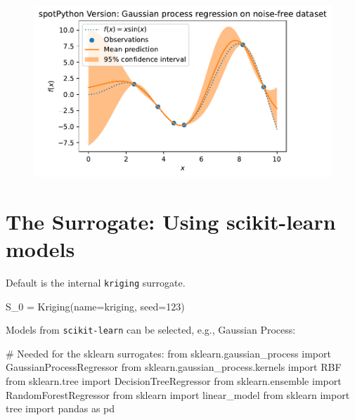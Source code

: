 \documentclass[
  letterpaper,
  DIV=11,
  numbers=noendperiod]{scrreprt}
\newenvironment{Shaded}{\begin{snugshade}}{\end{snugshade}}
\newcommand{\CommentTok}[1]{\textcolor[rgb]{0.37,0.37,0.37}{#1}}
\newcommand{\DecValTok}[1]{\textcolor[rgb]{0.68,0.00,0.00}{#1}}
\newcommand{\ImportTok}[1]{\textcolor[rgb]{0.00,0.46,0.62}{#1}}
\newcommand{\NormalTok}[1]{\textcolor[rgb]{0.00,0.23,0.31}{#1}}
\newcommand{\OperatorTok}[1]{\textcolor[rgb]{0.37,0.37,0.37}{#1}}
\newcommand{\StringTok}[1]{\textcolor[rgb]{0.13,0.47,0.30}{#1}}
\begin{document}
\begin{figure}[H]

{\centering \includegraphics{012_num_spot_ei_files/figure-pdf/cell-26-output-1.pdf}

}

\end{figure}

\hypertarget{the-surrogate-using-scikit-learn-models}{%
\section{The Surrogate: Using scikit-learn
models}\label{the-surrogate-using-scikit-learn-models}}

Default is the internal \texttt{kriging} surrogate.

\begin{Shaded}
\begin{Highlighting}[]
\NormalTok{S\_0 }\OperatorTok{=}\NormalTok{ Kriging(name}\OperatorTok{=}\StringTok{\textquotesingle{}kriging\textquotesingle{}}\NormalTok{, seed}\OperatorTok{=}\DecValTok{123}\NormalTok{)}
\end{Highlighting}
\end{Shaded}

Models from \texttt{scikit-learn} can be selected, e.g., Gaussian
Process:

\begin{Shaded}
\begin{Highlighting}[]
\CommentTok{\# Needed for the sklearn surrogates:}
\ImportTok{from}\NormalTok{ sklearn.gaussian\_process }\ImportTok{import}\NormalTok{ GaussianProcessRegressor}
\ImportTok{from}\NormalTok{ sklearn.gaussian\_process.kernels }\ImportTok{import}\NormalTok{ RBF}
\ImportTok{from}\NormalTok{ sklearn.tree }\ImportTok{import}\NormalTok{ DecisionTreeRegressor}
\ImportTok{from}\NormalTok{ sklearn.ensemble }\ImportTok{import}\NormalTok{ RandomForestRegressor}
\ImportTok{from}\NormalTok{ sklearn }\ImportTok{import}\NormalTok{ linear\_model}
\ImportTok{from}\NormalTok{ sklearn }\ImportTok{import}\NormalTok{ tree}
\ImportTok{import}\NormalTok{ pandas }\ImportTok{as}\NormalTok{ pd}
\end{Highlighting}
\end{Shaded}
\end{document}
